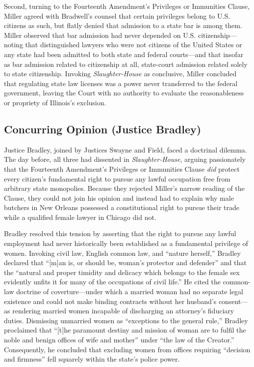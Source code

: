 \documentclass[12pt]{article}
\begin{document}
Second, turning to the Fourteenth Amendment's Privileges or Immunities Clause, Miller agreed with Bradwell's counsel that certain privileges belong to U.S. citizens as such, but flatly denied that admission to a state bar is among them. Miller observed that bar admission had never depended on U.S. citizenship---noting that distinguished lawyers who were not citizens of the United States or any state had been admitted to both state and federal courts---and that insofar as bar admission related to citizenship at all, state-court admission related solely to state citizenship. Invoking \textit{Slaughter-House} as conclusive, Miller concluded that regulating state law licenses was a power never transferred to the federal government, leaving the Court with no authority to evaluate the reasonableness or propriety of Illinois's exclusion.

\subsection{Concurring Opinion (Justice Bradley)}

Justice Bradley, joined by Justices Swayne and Field, faced a doctrinal dilemma. The day before, all three had dissented in \textit{Slaughter-House}, arguing passionately that the Fourteenth Amendment's Privileges or Immunities Clause \textit{did} protect every citizen's fundamental right to pursue any lawful occupation free from arbitrary state monopolies. Because they rejected Miller's narrow reading of the Clause, they could not join his opinion and instead had to explain why male butchers in New Orleans possessed a constitutional right to pursue their trade while a qualified female lawyer in Chicago did not.

Bradley resolved this tension by asserting that the right to pursue any lawful employment had never historically been established as a fundamental privilege of women. Invoking civil law, English common law, and ``nature herself,'' Bradley declared that ``[m]an is, or should be, woman's protector and defender'' and that the ``natural and proper timidity and delicacy which belongs to the female sex evidently unfits it for many of the occupations of civil life.'' He cited the common-law doctrine of coverture---under which a married woman had no separate legal existence and could not make binding contracts without her husband's consent---as rendering married women incapable of discharging an attorney's fiduciary duties. Dismissing unmarried women as ``exceptions to the general rule,'' Bradley proclaimed that ``[t]he paramount destiny and mission of woman are to fulfil the noble and benign offices of wife and mother'' under ``the law of the Creator.'' Consequently, he concluded that excluding women from offices requiring ``decision and firmness'' fell squarely within the state's police power.
\end{document}
